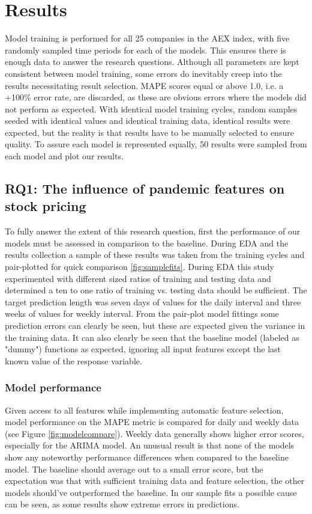\section{Results}
\label{sec:res}
Model training is performed for all 25 companies in the AEX index, with five randomly sampled time periods for each of the models. This ensures there is enough data to answer the research questions. Although all parameters are kept consistent between model training, some errors do inevitably creep into the results necessitating result selection. MAPE scores equal or above 1.0, i.e. a +100\% error rate, are discarded, as these are obvious errors where the models did not perform as expected. With identical model training cycles, random samples seeded with identical values and identical training data, identical results were expected, but the reality is that results have to be manually selected to ensure quality. To assure each model is represented equally, 50 results were sampled from each model and plot our results.

\subsection{RQ1: The influence of pandemic features on stock pricing}
To fully answer the extent of this research question, first the performance of our models must be assessed in comparison to the baseline. During EDA and the results collection a sample of these results was taken from the training cycles and pair-plotted for quick comparison \ref{fig:samplefits}.
During EDA this study experimented with different sized ratios of training and testing data and determined a ten to one ratio of training vs. testing data should be sufficient. The target prediction length was seven days of values for the daily interval and three weeks of values for weekly interval. From the pair-plot model fittings some prediction errors can clearly be seen, but these are expected given the variance in the training data. It can also clearly be seen that the baseline model (labeled as "dummy") functions as expected, ignoring all input features except the last known value of the response variable.

\subsubsection{Model performance}
Given access to all features while implementing automatic feature selection, model performance on the MAPE metric is compared for daily and weekly data (see Figure \ref{fig:modelcompare}).
Weekly data generally shows higher error scores, especially for the ARIMA model. An unusual result is that none of the models show any noteworthy performance differences when compared to the baseline model. The baseline should average out to a small error score, but the expectation was that with sufficient training data and feature selection, the other models should've outperformed the baseline. In our sample fits a possible cause can be seen, as some results show extreme errors in predictions.

